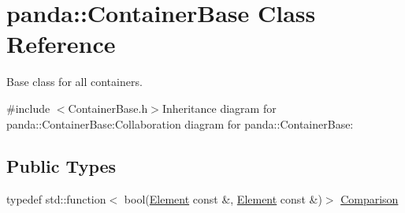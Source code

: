 \hypertarget{classpanda_1_1ContainerBase}{
\section{panda::ContainerBase Class Reference}
\label{classpanda_1_1ContainerBase}
}


Base class for all containers.  


{\ttfamily \#include $<$ContainerBase.h$>$}Inheritance diagram for panda::ContainerBase:Collaboration diagram for panda::ContainerBase:\subsection*{Public Types}
\begin{DoxyCompactItemize}
\item 
typedef std::function$<$ bool(\hyperlink{classpanda_1_1Element}{Element} const \&, \hyperlink{classpanda_1_1Element}{Element} const \&)$>$ \hyperlink{classpanda_1_1ContainerBase_a5269fda4f420b52d6ed9c0dac548559e}{Comparison}
\end{DoxyCompactItemize}
